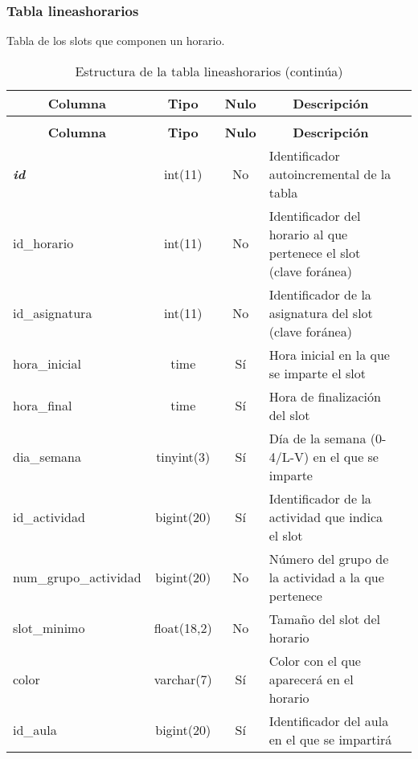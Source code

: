 \subsubsection{Tabla lineashorarios}
Tabla de los slots que componen un horario.

%
%
 \begin{longtable}{|l|c|c|l|l|} 
 \caption{Estructura de la tabla lineashorarios} \label{tab:lineashorarios-structure} \\
 \hline \multicolumn{1}{|c|}{\textbf{Columna}} & \multicolumn{1}{|c|}{\textbf{Tipo}} & \multicolumn{1}{|c|}{\textbf{Nulo}} & \multicolumn{1}{|c|}{\textbf{Descripción}} \\ \hline \hline
\endfirsthead
 \caption{Estructura de la tabla lineashorarios (continúa)} \\ 
 \hline \multicolumn{1}{|c|}{\textbf{Columna}} & \multicolumn{1}{|c|}{\textbf{Tipo}} & \multicolumn{1}{|c|}{\textbf{Nulo}} & \multicolumn{1}{|c|}{\textbf{Descripción}} \\ \hline \hline \endhead \endfoot 
\textbf{\textit{id}} & int(11) & No & Identificador autoincremental de la tabla \\ \hline 
id\_horario & int(11) & No & Identificador del horario al que pertenece el slot (clave foránea) \\ \hline 
id\_asignatura & int(11) & No & Identificador de la asignatura del slot (clave foránea) \\ \hline 
hora\_inicial & time & Sí & Hora inicial en la que se imparte el slot \\ \hline 
hora\_final & time & Sí & Hora de finalización del slot \\ \hline 
dia\_semana & tinyint(3)  & Sí & Día de la semana (0-4/L-V) en el que se imparte \\ \hline 
id\_actividad & bigint(20)  & Sí & Identificador de la actividad que indica el slot \\ \hline 
num\_grupo\_actividad & bigint(20)  & No & Número del grupo de la actividad a la que pertenece \\ \hline 
slot\_minimo & float(18,2) & No & Tamaño del slot del horario \\ \hline 
color & varchar(7) & Sí & Color con el que aparecerá en el horario \\ \hline 
id\_aula & bigint(20)  & Sí & Identificador del aula en el que se impartirá \\ \hline 
 \end{longtable}

